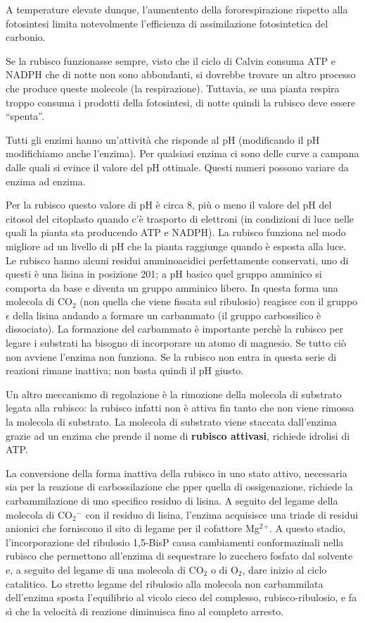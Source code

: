 \documentclass[]{article}
\begin{document}
A temperature elevate dunque, l'aumentento della fororespirazione
rispetto alla fotosintesi limita notevolmente l'efficienza di
assimilazione fotosintetica del carbonio.

Se la rubisco funzionasse sempre, visto che il ciclo di Calvin consuma
ATP e NADPH che di notte non sono abbondanti, si dovrebbe trovare un
altro processo che produce queste molecole (la respirazione). Tuttavia,
se una pianta respira troppo consuma i prodotti della fotosintesi, di
notte quindi la rubisco deve essere ``spenta''.

Tutti gli enzimi hanno un'attività che risponde al pH (modificando il pH
modifichiamo anche l'enzima). Per qualsiasi enzima ci sono delle curve a
campana dalle quali si evince il valore del pH ottimale. Questi numeri
possono variare da enzima ad enzima.

Per la rubisco questo valore di pH è circa 8, più o meno il valore del
pH del citosol del citoplasto quando c'è trasporto di elettroni (in
condizioni di luce nelle quali la pianta sta producendo ATP e NADPH). La
rubisco funziona nel modo migliore ad un livello di pH che la pianta
raggiunge quando è esposta alla luce. Le rubisco hanno alcuni residui
amminoacidici perfettamente conservati, uno di questi è una lisina in
posizione 201; a pH basico quel gruppo amminico si comporta da base e
diventa un gruppo amminico libero. In questa forma una molecola di
CO$_2$ (non quella che viene fissata sul ribulosio) reagisce con il
gruppo $\epsilon$ della lisina andando a formare un carbammato (il
gruppo carbossilico è dissociato). La formazione del carbammato è
importante perchè la rubisco per legare i substrati ha bisogno di
incorporare un atomo di magnesio. Se tutto ciò non avviene l'enzima non
funziona. Se la rubisco non entra in questa serie di reazioni rimane
inattiva; non basta quindi il pH giusto.

Un altro meccanismo di regolazione è la rimozione della molecola di
substrato legata alla rubisco: la rubisco infatti non è attiva fin tanto
che non viene rimossa la molecola di substrato. La molecola di substrato
viene staccata dall'enzima grazie ad un enzima che prende il nome di
\textbf{rubisco attivasi}, richiede idrolisi di ATP.

La conversione della forma inattiva della rubisco in uno stato attivo,
necessaria sia per la reazione di carbossilazione che pper quella di
ossigenazione, richiede la carbammilazione di uno specifico residuo di
lisina. A seguito del legame della molecola di CO$_2$$^-$ con il residuo
di lisina, l'enzima acquisisce una triade di residui anionici che
forniscono il sito di legame per il cofattore Mg$^2$$^+$. A questo
stadio, l'incorporazione del ribulosio 1,5-BisP causa cambiamenti
conformazinali nella rubisco che permettono all'enzima di sequestrare lo
zucchero fosfato dal solvente e, a seguito del legame di una molecola di
CO$_2$ o di O$_2$, dare inizio al ciclo catalitico. Lo stretto legame
del ribulosio alla molecola non carbammilata dell'enzima sposta
l'equilibrio al vicolo cieco del complesso, rubisco-ribulosio, e fa sì
che la velocità di reazione diminuisca fino al completo arresto.
\end{document}
